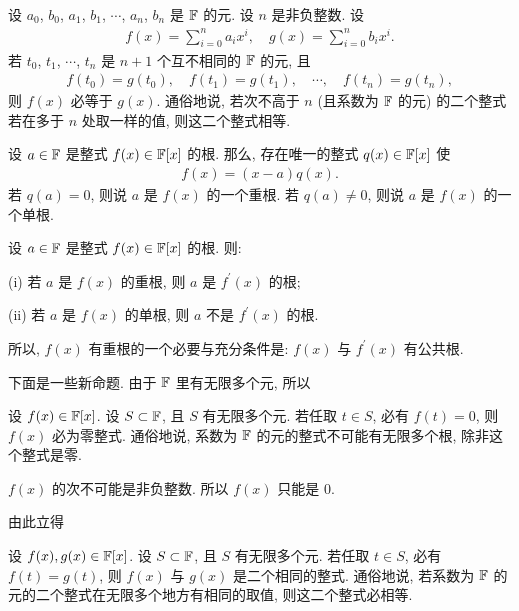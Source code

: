 \begin{proposition}
    设 $a_0$, $b_0$, $a_1$, $b_1$, $\cdots$, $a_n$, $b_n$ 是 $\mathbb{F}$ 的元. 设 $n$ 是非负整数. 设
    \begin{align*}
        f(x) = \sum_{i = 0}^n a_i x^i, \quad g(x) = \sum_{i = 0}^n b_i x^i.
    \end{align*}
    若 $t_0$, $t_1$, $\cdots$, $t_n$ 是 $n+1$ 个互不相同的 $\mathbb{F}$ 的元, 且
    \begin{align*}
        f(t_0) = g(t_0), \quad f(t_1) = g(t_1), \quad \cdots, \quad f(t_n) = g(t_n),
    \end{align*}
    则 $f(x)$ 必等于 $g(x)$. 通俗地说, 若次不高于 $n$ (且系数为 $\mathbb{F}$ 的元) 的二个整式若在多于 $n$ 处取一样的值, 则这二个整式相等.
\end{proposition}

\begin{definition}
    设 $a \in \mathbb{F}$ 是整式 $f(x) \in \mathbb{F}[x]$ 的根. 那么, 存在唯一的整式 $q(x) \in \mathbb{F}[x]$ 使
    \begin{align*}
        f(x) = (x - a) q(x).
    \end{align*}
    若 $q(a) = 0$, 则说 $a$ 是 $f(x)$ 的一个重根. 若 $q(a) \neq 0$, 则说 $a$ 是 $f(x)$ 的一个单根.
\end{definition}

\begin{proposition}
    设 $a \in \mathbb{F}$ 是整式 $f(x) \in \mathbb{F}[x]$ 的根. 则:

    (i) 若 $a$ 是 $f(x)$ 的重根, 则 $a$ 是 $f^{\prime} (x)$ 的根;

    (ii) 若 $a$ 是 $f(x)$ 的单根, 则 $a$ 不是 $f^{\prime} (x)$ 的根.

    所以, $f(x)$ 有重根的一个必要与充分条件是: $f(x)$ 与 $f^{\prime} (x)$ 有公共根.
\end{proposition}

下面是一些新命题. 由于 $\mathbb{F}$ 里有无限多个元, 所以

\begin{proposition}
    设 $f(x) \in \mathbb{F}[x]$. 设 $S \subset \mathbb{F}$, 且 $S$ 有无限多个元. 若任取 $t \in S$, 必有 $f(t) = 0$, 则 $f(x)$ 必为零整式. 通俗地说, 系数为 $\mathbb{F}$ 的元的整式不可能有无限多个根, 除非这个整式是零.
\end{proposition}

\begin{pf}
    $f(x)$ 的次不可能是非负整数. 所以 $f(x)$ 只能是 $0$.
\end{pf}

由此立得

\begin{proposition}
    设 $f(x),g(x) \in \mathbb{F}[x]$. 设 $S \subset \mathbb{F}$, 且 $S$ 有无限多个元. 若任取 $t \in S$, 必有 $f(t) = g(t)$, 则 $f(x)$ 与 $g(x)$ 是二个相同的整式. 通俗地说, 若系数为 $\mathbb{F}$ 的元的二个整式在无限多个地方有相同的取值, 则这二个整式必相等.
\end{proposition}

